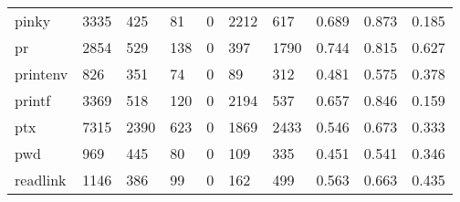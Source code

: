 \begin{longtable}{lp{1.3cm}p{1.3cm}p{1.3cm}p{1.3cm}p{1.3cm}p{1.3cm}p{1.3cm}p{1.3cm}p{1.3cm}}
pinky     &                   3335 &                                425 &                                81 &                                0 &                              2212 &                             617 &                                   0.689 &                                  0.873 &                                0.185 \\
pr        &                   2854 &                                529 &                               138 &                                0 &                               397 &                            1790 &                                   0.744 &                                  0.815 &                                0.627 \\
printenv  &                    826 &                                351 &                                74 &                                0 &                                89 &                             312 &                                   0.481 &                                  0.575 &                                0.378 \\
printf    &                   3369 &                                518 &                               120 &                                0 &                              2194 &                             537 &                                   0.657 &                                  0.846 &                                0.159 \\
ptx       &                   7315 &                               2390 &                               623 &                                0 &                              1869 &                            2433 &                                   0.546 &                                  0.673 &                                0.333 \\
pwd       &                    969 &                                445 &                                80 &                                0 &                               109 &                             335 &                                   0.451 &                                  0.541 &                                0.346 \\
readlink  &                   1146 &                                386 &                                99 &                                0 &                               162 &                             499 &                                   0.563 &                                  0.663 &                                0.435 \\

\end{longtable}
